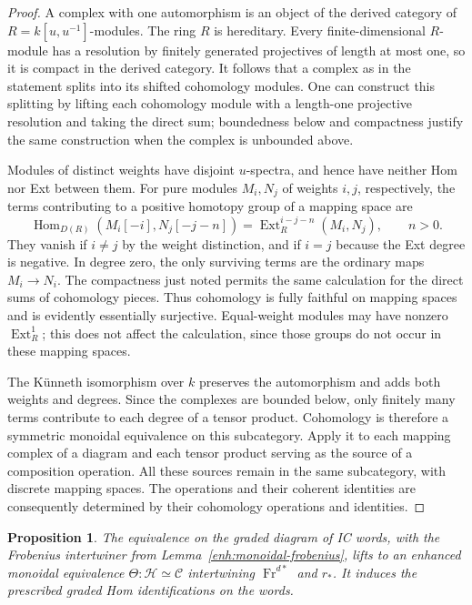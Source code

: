 \documentclass[11pt]{article}
\numberwithin{equation}{section}
\newtheorem{proposition}[theorem]{Proposition}
\theoremstyle{definition}
\theoremstyle{remark}
\newcommand{\Fr}{\operatorname{Fr}}
\newcommand{\Hom}{\operatorname{Hom}}
\newcommand{\Ext}{\operatorname{Ext}}
\begin{document}
\begin{proof}
A complex with one automorphism is an object of the derived
category of $R=k[u,u^{-1}]$-modules.  The ring $R$ is hereditary.
Every finite-dimensional $R$-module has a resolution by finitely
generated projectives of length at most one, so it is compact in
the derived category.  It follows that a complex as in the statement
splits into its shifted cohomology modules.  One can construct this
splitting by lifting each cohomology module with a length-one
projective resolution and taking the direct sum; boundedness below
and compactness justify the same construction when the complex is
unbounded above.

Modules of distinct weights have disjoint $u$-spectra, and hence
have neither Hom nor Ext between them.  For pure modules $M_i,N_j$
of weights $i,j$, respectively, the terms contributing to a positive
homotopy group of a mapping space are
\[
 \Hom_{D(R)}(M_i[-i],N_j[-j-n])
       =\Ext_R^{i-j-n}(M_i,N_j),\qquad n>0.
\]
They vanish if $i\ne j$ by the weight distinction, and if $i=j$
because the Ext degree is negative.  In degree zero, the only
surviving terms are the ordinary maps $M_i\to N_i$.
The compactness just noted permits the same calculation for the
direct sums of cohomology pieces.  Thus cohomology is fully faithful
on mapping spaces and is evidently essentially surjective.
Equal-weight modules may have nonzero $\Ext_R^1$; this does not
affect the calculation, since those groups do not occur in these
mapping spaces.

The K\"unneth isomorphism over $k$ preserves the automorphism and
adds both weights and degrees.  Since the complexes are bounded
below, only finitely many terms contribute to each degree of a
tensor product.  Cohomology is therefore a symmetric monoidal
equivalence on this subcategory.  Apply it to each mapping complex
of a diagram and each tensor product serving as the source of a
composition operation.  All these sources remain in the same
subcategory, with discrete mapping spaces.  The operations and
their coherent identities are consequently determined by their
cohomology operations and identities.
\end{proof}

\begin{proposition}\label{enh:lift}
The equivalence on the graded diagram of IC words, with the
Frobenius intertwiner from Lemma~\ref{enh:monoidal-frobenius}, lifts
to an enhanced monoidal equivalence
$\Theta:\mathscr H\simeq\mathscr C$ intertwining $\Fr^{d*}$ and
$r_*$.  It induces the prescribed graded Hom identifications on
the words.
\end{proposition}
\end{document}
